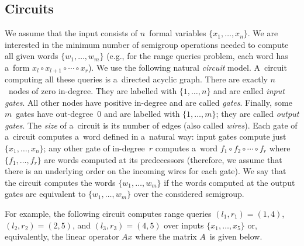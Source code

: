 \documentclass[review,onefignum,onetabnum]{siamart190516}
\begin{document}
\subsection{Circuits}\label{subsec:circuits}
We assume that the input consists of $n$~formal variables
$\{x_1, \dotsc, x_n\}$. We are interested in the minimum number of semigroup
operations needed to compute all given words $\{w_1, \dotsc, w_m\}$ (e.g., for
the range queries problem, each word has a~form $x_l\circ x_{l+1}\circ \dotsb \circ x_r$). We use
the following natural {\em circuit} model. A~circuit computing all these queries
is a~directed acyclic graph. There are exactly $n$~nodes of zero in-degree. They
are labelled with $\{1, \dotsc, n\}$ and are called {\em input gates}. All
other nodes have positive in-degree and are called {\em gates}. Finally, some
$m$~gates have out-degree~0 and are labelled with $\{1, \dotsc, m\}$; they are called {\em output gates}. The
{\em size} of a~circuit is its number of edges (also called {\em wires}). Each
gate of a~circuit computes a~word defined in a~natural way: input gates compute
just $\{x_1, \dotsc, x_n\}$; any other gate of in-degree~$r$ computes a~word
$f_1 \circ f_2 \circ \dotsb \circ f_r$ where $\{f_1, \dotsc, f_r\}$ are words
computed at its predecessors (therefore, we assume that there is an underlying
order on the incoming wires for each gate). We say that the circuit computes the
words $\{w_1, \dotsc, w_m\}$ if the words computed at the output gates are
equivalent to $\{w_1, \dotsc, w_m\}$ over the considered semigroup.

For example, the following circuit computes range queries
$(l_1,r_1)=(1,4)$,
$(l_2,r_2)=(2,5)$, and
$(l_3,r_3)=(4,5)$
over inputs $\{x_1, \dotsc, x_5\}$ or, equivalently, the
linear operator $Ax$ where the matrix $A$~is given below.

\begin{center}
\end{center}
\end{document}
